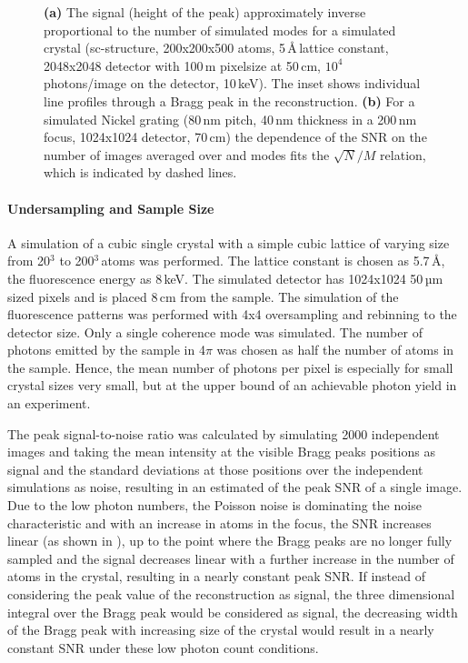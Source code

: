 \begin{figure}
{	\textbf{(a)} The signal (height of the peak) approximately inverse proportional to the number of simulated modes for a simulated crystal
	(sc-structure, 200x200x500 atoms, 5\,\AA\,lattice constant, 2048x2048 detector with 100\,\textmu m pixelsize at 50\,cm, $10^4$ photons/image on the detector, 10\,keV). The inset shows individual line profiles through a Bragg peak in the reconstruction. \textbf{(b)} For a simulated Nickel grating (80\,nm pitch, 40\,nm thickness in a 200\,nm focus, 1024x1024 detector, 70\,cm) the dependence of the SNR on the number of images averaged over and modes fits the $\sqrt{N}/M$ relation, which is indicated by dashed lines.}
\end{figure}

\paragraph{Undersampling and  Sample Size}


A simulation of a cubic single crystal with a simple cubic lattice of varying size from 20$^3$ to 200$^3$\,atoms was performed. The lattice constant is chosen as 5.7\,\AA, the fluorescence energy as 8\,keV. The simulated detector has 1024x1024 50\,µm sized pixels and is placed 8\,cm from the  sample. The simulation of the fluorescence patterns was performed with 4x4 oversampling and rebinning to the detector size. Only a single coherence mode was simulated. The number of photons emitted by the sample in 4$\pi$ was chosen as half the number of atoms in the sample. Hence, the mean number of photons per pixel is especially for small crystal sizes very small, but at the upper bound of an achievable photon yield in an experiment.

The peak signal-to-noise ratio was calculated by simulating 2000 independent images  and taking the mean intensity at the visible Bragg peaks positions as signal and the standard deviations at those positions over the independent simulations as noise, resulting in an estimated of the peak SNR of a single image.
Due to the low photon numbers, the Poisson noise is dominating the noise characteristic and with an increase in atoms in the focus, the SNR increases linear (as shown in ), up to the point where the Bragg peaks are no longer fully sampled and the signal decreases linear with a further increase in the number of atoms in the crystal, resulting in a nearly constant peak SNR.
If instead of considering the peak value of the reconstruction as signal, the three dimensional integral over the Bragg peak would be considered as signal, the decreasing width of the Bragg peak with increasing size of the crystal would result in a nearly constant SNR under these low photon count conditions. 



